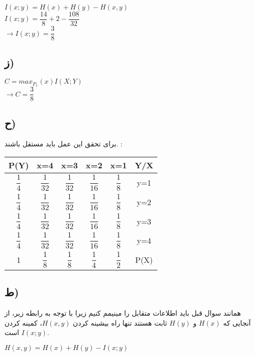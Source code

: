 \null \hfill $ I(x;y) = H(x) + H(y) - H(x,y) $ \\
\null \hfill $ I(x;y) = \dfrac{14}{8} + 2 - \dfrac{108}{32} $ \\
\null \hfill $ \rightarrow I(x;y) = \dfrac{3}{8} $ \\


 
\subsection{ز)}
\null \hfill $ C = max_P_x (x) I(X;Y) $ \\
\null \hfill $ \rightarrow C = \dfrac{3}{8} $ \\


\subsection{ح)}
برای تحقق این عمل باید مستقل باشند. :

\begin{table}[h!]
\centering
\begin{tabular}{||c c c c c||c||} 
 \hline
 P(Y) & x=4 & x=3 & x=2 & x=1 & Y/X \\ [0.5ex] 
 \hline\hline
 $\dfrac{1}{4}$ & $\dfrac{1}{32}$ & $\dfrac{1}{32}$ & $\dfrac{1}{16}$ & $\dfrac{1}{8}$ & y=1 \\ 
 $\dfrac{1}{4}$ & $\dfrac{1}{32}$ & $\dfrac{1}{32}$ & $\dfrac{1}{16}$ & $\dfrac{1}{8}$ & y=2 \\
 $\dfrac{1}{4}$ & $\dfrac{1}{32}$ & $\dfrac{1}{32}$ & $\dfrac{1}{16}$ & $\dfrac{1}{8}$ & y=3 \\
 $\dfrac{1}{4}$ & $\dfrac{1}{32}$ & $\dfrac{1}{32}$ & $\dfrac{1}{16}$ & $\dfrac{1}{8}$ & y=4 \\
 1 & $\dfrac{1}{8}$ & $\dfrac{1}{8}$ & $\dfrac{1}{4}$ & $\dfrac{1}{2}$ & P(X) \\ [1ex] 
 \hline
\end{tabular}
\end{table}
\subsection{ط)}
همانند سوال قبل باید اطلاعات متقابل را مینیمم کنیم زیرا با توجه به رابطه زیر، از آنجایی که 
 \(H(x)\)
و
 \(H(y)\)
ثابت هستند تنها راه بیشینه کردن 
 \(H(x,y)\)، 
کمینه کردن 
 \(I(x;y)\)
است.

\null \hfill $ H(x,y) = H(x) + H(y) - I(x;y) $ \\

